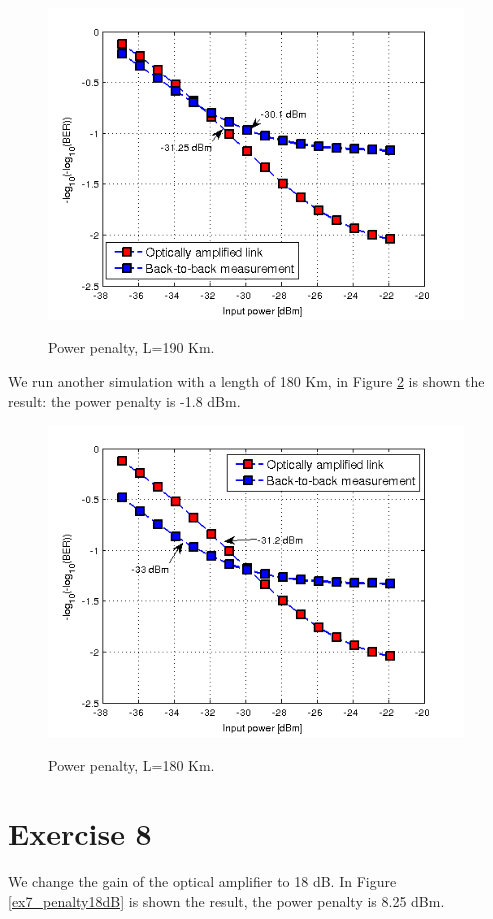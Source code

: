 \documentclass[a4paper,10pt]{report}
\begin{document}
\begin{figure}[!ht]
   \centering
   \includegraphics[width=11cm]{ex7_penalty190km.png}\\
   \caption{Power penalty, L=190 Km.}
   \label{ex7_penalty190km}
\end{figure}

We run another simulation with a length of 180 Km, in Figure \ref{ex7_penalty180km} is shown the result: the power penalty is -1.8 dBm.
\begin{figure}[!ht]
   \centering
   \includegraphics[width=11cm]{ex7_penalty180km.png}\\
   \caption{Power penalty, L=180 Km.}
   \label{ex7_penalty180km}
\end{figure}


\newpage
\section*{Exercise 8}
We change the gain of the optical amplifier to 18 dB. In Figure \ref{ex7_penalty18dB} is shown the result, the power penalty is 8.25 dBm.
\end{document}
